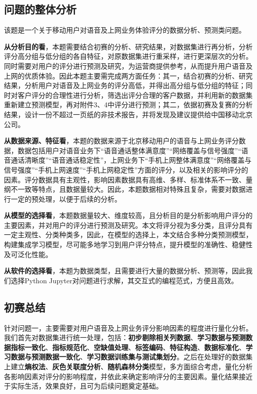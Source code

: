 \documentclass{MathorCupmodeling}
\begin{document}
	\subsection{问题的整体分析}
	该题是一个关于移动用户对语音及上网业务体验评分的数据分析、预测类问题。

	\textbf{从分析目的看}，本题需要结合初赛的分析、研究结果，对数据集进行再分析，分析评分高分组与低分组的各自特征，对原数据集进行重采样，进行更深层次的分析。同时需要对用户的评分进行预测及研究，为运营商提供参考，从而提升用户语音及上网的优质体验。因此本题主要需完成两方面任务：{\heiti 其一}，结合初赛的分析、研究结果，分析用户对语音及上网业务的评分高低，并得出高分组与低分组的特征；同时对客户评分的合理性进行分析，筛选出评分合理的客户数据，并利用新的数据集重新建立预测模型，再对附件3、4中评分进行预测；{\heiti 其二}，依据初赛及复赛的分析结果，设计一份不超过一页纸的非技术报告，并将发现及建议提供给中国移动北京公司。

	\textbf{从数据来源、特征看}，本题的数据来源于北京移动用户的语音与上网业务评分数据，数据包括用户对语音业务下“语音通话整体满意度”“网络覆盖与信号强度”“语音通话清晰度”“语音通话稳定性”，上网业务下“手机上网整体满意度”“网络覆盖与信号强度”“手机上网速度”“手机上网稳定性”方面的评分，以及相关的影响评分的因素。评分数据具有主观性，影响因素数据具有高维、多样、标准体系不一致、量纲不一致等特点，且数据量较大。因此，本题数据相对特殊且复杂，需要对数据进行一定的预处理，以便于后续的分析。
	
	\textbf{从模型的选择看}，本题数据量较大、维度较高，且分析目的是分析影响用户评分的主要因素，并对用户的评分进行预测及研究。本文将评分视为多分类，且评分具有一定主观性、分类种类多，因此，在模型的选择上，本文结合多种分类预测模型，构建集成学习模型，尽可能多地学习到用户评分特点，提升模型的准确性、稳健性及可泛化性能。

	\textbf{从软件的选择看}，本题为数据类型，且需要进行大量的数据分析、预测等，因此我们选择Python Jupyter对问题进行求解，其交互式的编程范式，方便且高效。

	\subsection{初赛总结}
	{\heiti 针对问题一}，主要需要对用户语音及上网业务评分影响因素的程度进行量化分析。我们首先对数据集进行统一处理，包括：\textbf{初步剔除相关列数据}、\textbf{学习数据与预测数据指标一致化}、\textbf{指标规范化}、\textbf{空缺值处理}、\textbf{标签编码}、\textbf{特征构造}、\textbf{数据标准化}、\textbf{学习数据与预测数据一致化}、\textbf{学习数据训练集与测试集划分}。之后在处理好的数据集上建立\textbf{熵权法}、\textbf{灰色关联度分析}、\textbf{随机森林分类}模型，多方面综合考虑，量化分析各影响因素对评分的影响程度，并依此来确定影响评分的主要因素。量化结果接近于实际生活，效果良好，且可为后续问题奠定基础。
	
\end{document}

